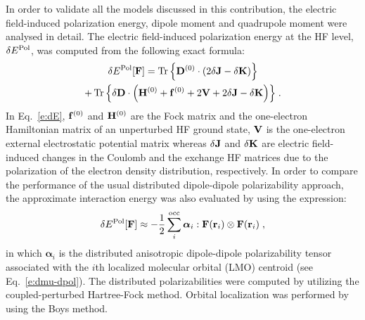 \documentclass[aip,amsmath,amssymb,reprint,floatfix]{revtex4-1}
\newcommand{\BM}[1]{\bm{#1}}
\DeclareMathOperator{\Tr}{Tr}
\begin{document}
In order to validate all the models discussed in this contribution,
the electric field\hyp{}induced polarization energy, 
dipole moment and quadrupole moment were analysed in detail.
The electric field\hyp{}induced polarization energy at the HF level, $\delta E^{\rm Pol}$,
was computed from the following exact formula:
%
\begin{multline}\label{e:dE}
 \delta E^{\rm Pol}[{\bf F}] = 
                     \Tr{\left\{ {\bf D}^{(0)} \cdot
                                \left( 2\delta {\bf J} - \delta {\bf K}  \right) \right\}} \\
                   + \Tr{\left\{ \delta {\bf D} \cdot
                                \left( {\bf H}^{(0)} + {\bf f}^{(0)} + 2{\bf V} + 2\delta {\bf J} - \delta {\bf K}\right) \right\}} \;.
\end{multline}
%
In Eq.~\eqref{e:dE}, ${\bf f}^{(0)}$ and ${\bf H}^{(0)}$ are the Fock matrix and 
the one\hyp{}electron Hamiltonian matrix of an unperturbed HF ground state,
${\bf V}$ is the one\hyp{}electron external electrostatic potential matrix whereas $\delta {\bf J}$
and $\delta {\bf K}$ are electric field\hyp{}induced changes in the Coulomb and the exchange HF matrices due to 
the polarization of the electron density distribution, respectively. 
In order to compare the performance of the usual 
distributed dipole\hyp{}dipole polarizability approach,
the approximate interaction energy was also evaluated by using the expression:
%
\begin{equation}\label{e:dE-dpol}
 \delta E^{\rm Pol}[{\bf F}] \approx 
                   - \frac{1}{2} \sum_i^{\rm occ} {\BM \alpha}_i : {\bf F}({\bf r}_i) \otimes {\bf F}({\bf r}_i) \;,
\end{equation}
%
in which ${\BM \alpha}_i$ is the distributed anisotropic dipole\hyp{}dipole polarizability tensor associated with the
$i$th localized molecular orbital (LMO) centroid (see Eq.~\eqref{e:dmu-dpol}).
The distributed polarizabilities were computed by utilizing the coupled\hyp{}perturbed Hartree\hyp{}Fock
method.\cite{McWeeny.RevModPhys.1960,Dodds.McWeeney.Sadlej.MolPhys.1977} 
Orbital localization was performed by using the Boys method.\cite{Boys.RevModPhys.1960} 
\end{document}
